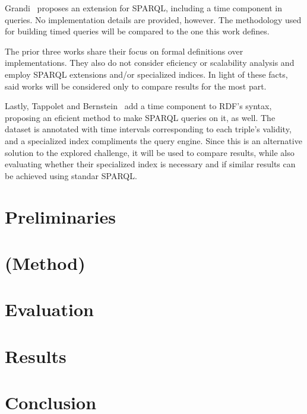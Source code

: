 \documentclass{llncs}
\begin{document}
Grandi~\cite{Grandi10} proposes an extension for SPARQL, including a time component in queries. No implementation details are provided, however. The methodology used for building timed queries will be compared to the one this work defines.


The prior three works share their focus on formal definitions over implementations. They also do not consider eficiency or scalability analysis and employ SPARQL extensions and/or specialized indices. In light of these facts, said works will be considered only to compare results for the most part.


Lastly, Tappolet and Bernstein~\cite{TappoletB09} add a time component to RDF's syntax, proposing an eficient method to make SPARQL queries on it, as well. The dataset is annotated with time intervals corresponding to each triple's validity, and a specialized index compliments the query engine. Since this is an alternative solution to the explored challenge, it will be used to compare results, while also evaluating whether their specialized index is necessary and if similar results can be achieved using standar SPARQL.
\section{Preliminaries} %
\section{(Method)} %
\section{Evaluation} %
\section{Results}    %
\section{Conclusion}
\newpage


\end{document}
